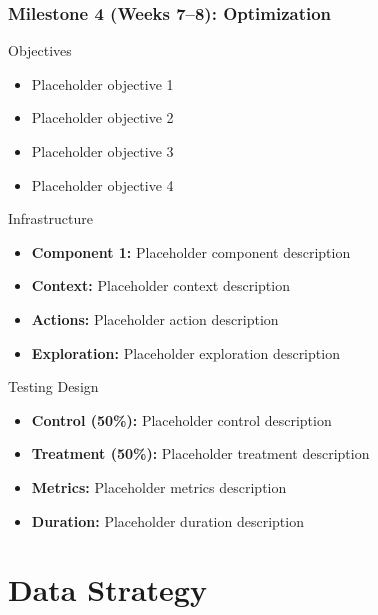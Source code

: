 \begin{frame}
\frametitle{Milestone 4 (Weeks 7--8): Optimization}
\begin{block}{Objectives}
\begin{itemize}
\item Placeholder objective 1
\item Placeholder objective 2
\item Placeholder objective 3
\item Placeholder objective 4
\end{itemize}
\end{block}

\begin{block}{Infrastructure}
\begin{itemize}
\item \textbf{Component 1:} Placeholder component description
\item \textbf{Context:} Placeholder context description
\item \textbf{Actions:} Placeholder action description
\item \textbf{Exploration:} Placeholder exploration description
\end{itemize}
\end{block}

\begin{block}{Testing Design}
\begin{itemize}
\item \textbf{Control (50\%):} Placeholder control description
\item \textbf{Treatment (50\%):} Placeholder treatment description
\item \textbf{Metrics:} Placeholder metrics description
\item \textbf{Duration:} Placeholder duration description
\end{itemize}
\end{block}
\end{frame}

\section{Data Strategy}\label{sec:data}

